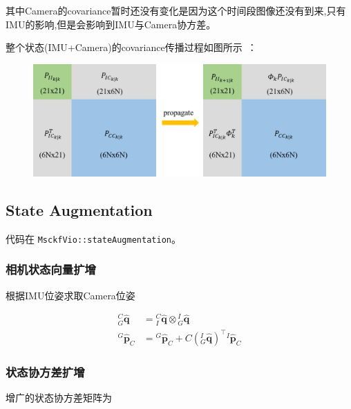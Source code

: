 \documentclass[12pt,a4paper]{article}
\begin{document}
其中Camera的covariance暂时还没有变化是因为这个时间段图像还没有到来,只有IMU的影响,但是会影响到IMU与Camera协方差。

整个状态(IMU+Camera)的covariance传播过程如图所示~\cite{xinliang-zhong-msckf_notes}：

\begin{figure}[!htbp]
\centering
\includegraphics[scale=0.6]{images/imu_propagate.png}
\end{figure}

\subsection{State Augmentation}

代码在 \verb|MsckfVio::stateAugmentation|。

\subsubsection{相机状态向量扩增}

根据IMU位姿求取Camera位姿

\begin{equation}
\begin{aligned}
{}^C_G\hat{\mathbf{q}} &= {}^C_I\hat{\mathbf{q}} \otimes {}^I_G\hat{\mathbf{q}} \\
{}^G\hat{\mathbf{p}}_C &= {}^G\hat{\mathbf{p}}_C + C\left({}^I_G\hat{\mathbf{q}}\right)^\top {}^I\hat{\mathbf{p}}_C
\end{aligned}
\end{equation}

\subsubsection{状态协方差扩增}

增广的状态协方差矩阵为
\end{document}
